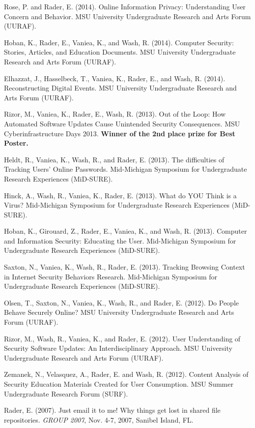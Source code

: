 \documentclass[9pt]{extarticle}
\begin{document}
Rose, P. and Rader, E. (2014). Online Information Privacy: Understanding User Concern and Behavior. MSU University Undergraduate Research and Arts Forum (UURAF).

Hoban, K., Rader, E., Vaniea, K., and Wash, R. (2014). Computer Security: Stories, Articles, and Education Documents. MSU University Undergraduate Research and Arts Forum (UURAF).

Elhazzat, J., Hasselbeck, T., Vaniea, K., Rader, E., and Wash, R. (2014). Reconstructing Digital Events. MSU University Undergraduate Research and Arts Forum (UURAF).

Rizor, M., Vaniea, K., Rader, E., Wash, R. (2013). Out of the Loop: How Automated Software Updates Cause Unintended Security Consequences. MSU Cyberinfrastructure Days 2013. \textbf{Winner of the 2nd place prize for Best Poster.}

Heldt, R., Vaniea, K., Wash, R., and Rader, E. (2013). The difficulties of Tracking Users' Online Passwords. Mid-Michigan Symposium for Undergraduate Research Experiences (MiD-SURE). 

Hinck, A., Wash, R., Vaniea, K., Rader, E. (2013). What do YOU Think is a Virus? Mid-Michigan Symposium for Undergraduate Research Experiences (MiD-SURE).

Hoban, K., Girouard, Z., Rader, E., Vaniea, K., and Wash, R. (2013). Computer and Information Security: Educating the User. Mid-Michigan Symposium for Undergraduate Research Experiences (MiD-SURE).

Saxton, N., Vaniea, K., Wash, R., Rader, E. (2013). Tracking Browsing Context in Internet Security Behaviors Research. Mid-Michigan Symposium for Undergraduate Research Experiences (MiD-SURE).

Olsen, T., Saxton, N., Vaniea, K., Wash, R., and Rader, E. (2012). Do People Behave Securely Online? MSU University Undergraduate Research and Arts Forum (UURAF).

Rizor, M., Wash, R., Vaniea, K., and Rader, E. (2012). User Understanding of Security Software Updates: An Interdisciplinary Approach. MSU University Undergraduate Research and Arts Forum (UURAF).

Zemanek, N., Velasquez, A., Rader, E. and Wash, R. (2012). Content Analysis of Security Education Materials Created for User Consumption. MSU Summer Undergraduate Research Forum (SURF).
  
Rader, E. (2007). Just email it to me! Why things get lost in shared file repositories. \emph{GROUP 2007}, Nov. 4-7, 2007, Sanibel Island, FL.
\end{document}
